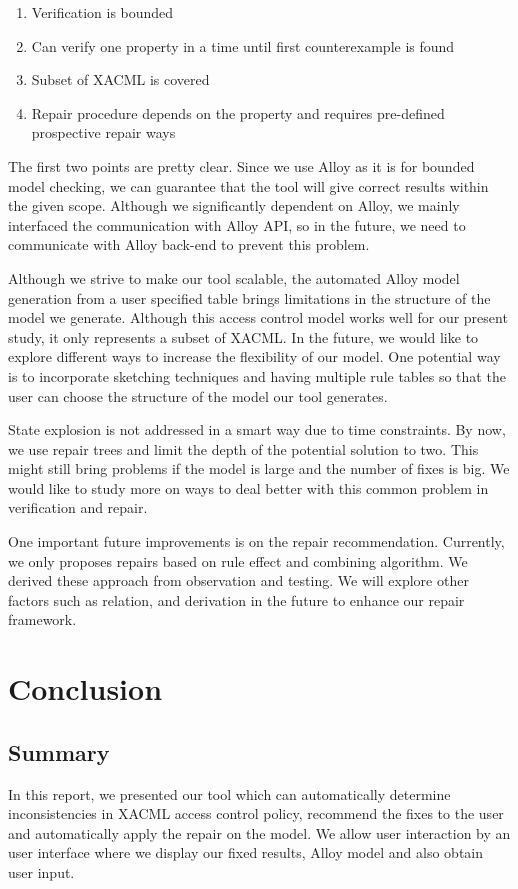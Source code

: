 \documentclass{acm_proc_article-sp}
\begin{document}
\begin{enumerate}
\item Verification is bounded
\item Can verify one property in a time until first counterexample is found
\item Subset of XACML is covered
\item Repair procedure depends on the property and requires pre-defined prospective repair ways
\end{enumerate}

The first two points are pretty clear. Since we use Alloy as it is for bounded model checking, we can guarantee that the tool will give correct results within the given scope. Although we significantly dependent on Alloy, we mainly interfaced the communication with Alloy API, so in the future, we need to communicate with Alloy back-end to prevent this problem.

Although we strive to make our tool scalable, the automated Alloy model generation from a user specified table brings limitations in the structure of the model we generate. Although this access control model works well for our present study, it only represents a subset of XACML. In the future, we would like to explore different ways to increase the flexibility of our model. One potential way is to incorporate sketching techniques and having multiple rule tables so that the user can choose the structure of the model our tool generates.

State explosion is not addressed in a smart way due to time constraints. By now, we use repair trees and limit the depth of the potential solution to two. This might still bring problems if the model is large and the number of fixes is big. We would like to study more on ways to deal better with this common problem in verification and repair.

One important future improvements is on the repair recommendation. Currently, we only proposes repairs based on rule effect and combining algorithm. We derived these approach from observation and testing. We will explore other factors such as relation, and derivation in the future to enhance our repair framework.

\section{Conclusion}

\subsection{Summary}
In this report, we presented our tool which can automatically determine inconsistencies in XACML access control policy, recommend the fixes to the user and automatically apply the repair on the model. We allow user interaction by an user interface where we display our fixed results, Alloy model and also obtain user input.
\end{document}
